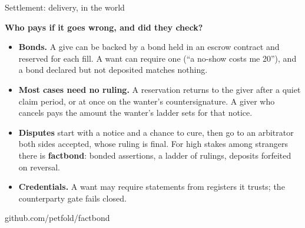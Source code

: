 \documentclass[aspectratio=169,11pt]{beamer}
\begin{document}
\begin{frame}{Settlement: delivery, in the world}
  {\color{accent}\bfseries Who pays if it goes wrong, and did they check?\par}
  \vspace{2mm}
  \small
  \begin{itemize}\setlength{\itemsep}{1.6mm}
    \item \textbf{Bonds.} A give can be backed by a bond held in an escrow contract and reserved for each fill. A want can require one (``a no-show costs me 20''), and a bond declared but not deposited matches nothing.
    \item \textbf{Most cases need no ruling.} A reservation returns to the giver after a quiet claim period, or at once on the wanter's countersignature. A giver who cancels pays the amount the wanter's ladder sets for that notice.
    \item \textbf{Disputes} start with a notice and a chance to cure, then go to an arbitrator both sides accepted, whose ruling is final. For high stakes among strangers there is \textbf{factbond}: bonded assertions, a ladder of rulings, deposits forfeited on reversal.
    \item \textbf{Credentials.} A want may require statements from registers it trusts; the counterparty gate fails closed.
  \end{itemize}
  \vspace{1mm}
  {\scriptsize\color{soft}github.com/petfold/factbond\par}
\end{frame}
\end{document}

